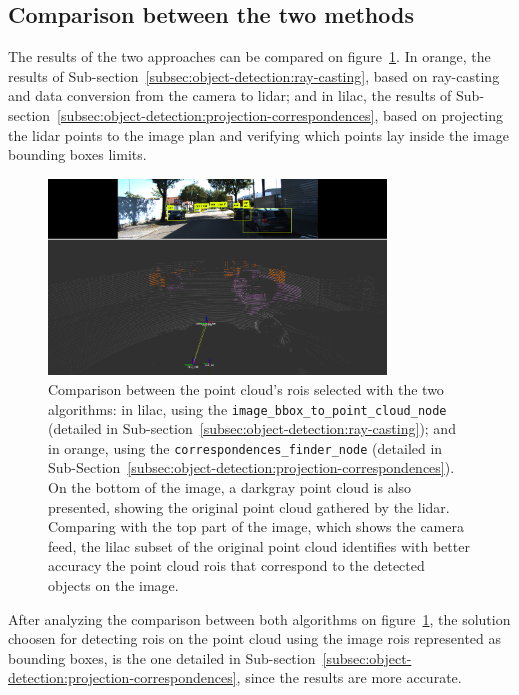 \subsection{Comparison between the two methods}
The results of the two approaches can be compared on figure~\ref{fig:rois-matching-comparison}. In orange, the results of Sub-section~\ref{subsec:object-detection:ray-casting}, based on ray-casting and data conversion from the camera to \ac{lidar}; and in lilac, the results of Sub-section~\ref{subsec:object-detection:projection-correspondences}, based on projecting the \ac{lidar} points to the image plan and verifying which points lay inside the image bounding boxes limits.


\begin{figure}[H]
	\centering
	\includegraphics[width=0.8\textwidth]{img/image-object-to-point-cloud/rois-comparison.png}
	\caption{Comparison between the point cloud's \acp{roi} selected with the two algorithms: in lilac, using the \texttt{image\_bbox\_to\_point\_cloud\_node} (detailed in Sub-section~\ref{subsec:object-detection:ray-casting}); and in orange, using the \texttt{correspondences\_finder\_node} (detailed in Sub-Section~\ref{subsec:object-detection:projection-correspondences}). On the bottom of the image, a darkgray point cloud is also presented, showing the original point cloud gathered by the \ac{lidar}. Comparing with the top part of the image, which shows the camera feed, the lilac subset of the original point cloud identifies with better accuracy the point cloud \acp{roi} that correspond to the detected objects on the image.}
	\label{fig:rois-matching-comparison}
\end{figure}

After analyzing the comparison between both algorithms on figure~\ref{fig:rois-matching-comparison}, the solution choosen for detecting \acp{roi} on the point cloud using the image \acp{roi} represented as bounding boxes, is the one detailed in Sub-section~\ref{subsec:object-detection:projection-correspondences}, since the results are more accurate.

